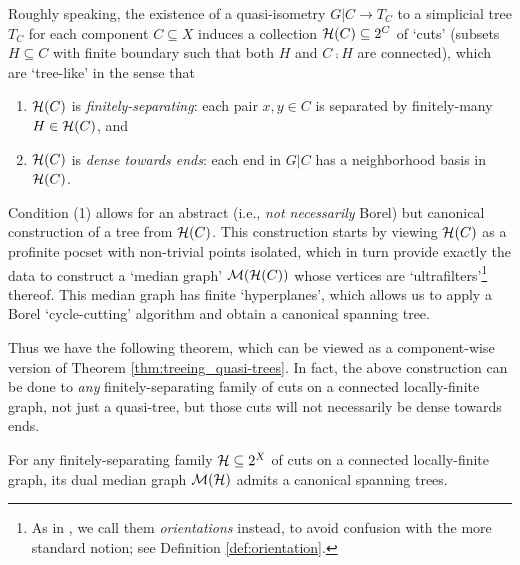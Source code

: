\documentclass[reqno]{amsart}
\begin{document}
    Roughly speaking, the existence of a quasi-isometry $G|C\to T_C$ to a simplicial tree $T_C$ for each component $C\subseteq X$ induces a collection $\mathcal{H}(C)\subseteq2^C$ of `cuts' (subsets $H\subseteq C$ with finite boundary such that both $H$ and $C\comp H$ are connected), which are `tree-like' in the sense that
    \begin{enumerate}
        \item[1.] $\mathcal{H}(C)$ is \textit{finitely-separating}: each pair $x,y\in C$ is separated by finitely-many $H\in\mathcal{H}(C)$, and
        \item[2.] $\mathcal{H}(C)$ is \textit{dense towards ends}: each end in $G|C$ has a neighborhood basis in $\mathcal{H}(C)$.
    \end{enumerate}
    Condition (1) allows for an abstract (i.e., \textit{not necessarily} Borel) but canonical construction of a tree from $\mathcal{H}(C)$. This construction starts by viewing $\mathcal{H}(C)$ as a profinite pocset with non-trivial points isolated, which in turn provide exactly the data to construct a `median graph' $\mathcal{M}(\mathcal{H}(C))$ whose vertices are `ultrafilters'\footnote{As in \cite{CPTT23}, we call them \textit{orientations} instead, to avoid confusion with the more standard notion; see Definition \ref{def:orientation}.} thereof. This median graph has finite `hyperplanes', which allows us to apply a Borel `cycle-cutting' algorithm and obtain a canonical spanning tree.

    Thus we have the following theorem, which can be viewed as a component-wise version of Theorem \ref{thm:treeing_quasi-trees}. In fact, the above construction can be done to \textit{any} finitely-separating family of cuts on a connected locally-finite graph, not just a quasi-tree, but those cuts will not necessarily be dense towards ends.

    \begin{mainTheorem}\label{thm:component-wise_construction}
        For any finitely-separating family $\mathcal{H}\subseteq2^X$ of cuts on a connected locally-finite graph, its dual median graph $\mathcal{M}(\mathcal{H})$ admits a canonical spanning trees.
    \end{mainTheorem}
\end{document}
